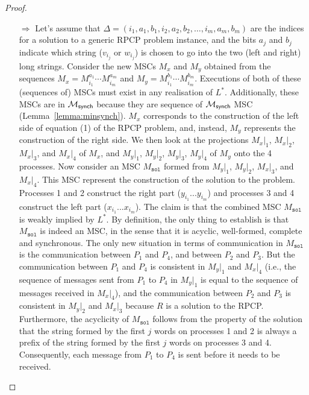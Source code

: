\begin{proof}
	\begin{itemize}
		\item[$\Rightarrow$]
		      Let's assume that
		      $\Delta = (i_1, a_1, b_1, i_2, a_2, b_2, \ldots, i_m, a_m, b_m)$ are the indices
		      for a solution to a generic RPCP problem instance, and the bits $a_j$ and
		      $b_j$ indicate which string ($v_{i_j}$ or $w_{i_j}$) is chosen to go into
		      the two (left and right)
		      long strings. Consider the new MSCs $M_x$ and $M_y$ obtained from the sequences
		      $M_x = M^{a_1}_{i_1} \cdots M^{a_m}_{i_m}$ and $M_y = M^{b_1}_{i_1} \cdots M^{b_m}_{i_m}$.
		      Executions of both of these (sequences of) MSCs must exist in any
		      realisation of $L^*$. Additionally, these MSCs are in $\mathcal{M}_{\mathsf{synch}}$
		      because they are sequence of $\mathcal{M}_{\mathsf{synch}}$ MSC (Lemma~\ref{lemma:minsynch}).
		      $M_x$ corresponds to the construction of the left side of equation (1) of the RPCP
		      problem, and, instead, $M_y$ represents the construction of the right side.
		      We then look at the projections $M_x|_1$, $M_x|_2$, $M_x|_3$,
		      and $M_x|_4$ of $M_x$, and $M_y|_1$, $M_y|_2$, $M_y|_3$, $M_y|_4$ of $M_y$ onto the
		      4 processes. Now consider an MSC $M_{\texttt{sol}}$ formed from $M_y|_1$, $M_y|_2$,
		      $M_x|_3$, and $M_x|_4$. This MSC represent the construction of the solution to
		      the problem. Processes 1 and 2 construct the right part ($y_{i_1}...y_{i_m}$)
		      and processes 3 and 4 construct the left part ($x_{i_1}...x_{i_m}$).
		      The claim is that the combined MSC $M_{\texttt{sol}}$ is weakly
		      implied by $L^*$. By definition, the only thing to establish is that $M_{\texttt{sol}}$
		      is indeed an MSC, in the sense that it is acyclic, well-formed, complete
		      and synchronous.
		      The only new situation in terms of communication in $M_{\texttt{sol}}$ is the
		      communication between $P_1$ and $P_4$, and between $P_2$ and $P_3$.
		      But the communication between $P_1$ and $P_4$ is consistent in
		      $M_y|_1$ and $M_x|_4$ (i.e., the sequence of messages sent from $P_1$ to
		      $P_4$ in $M_y|_1$ is equal to the sequence of messages received in $M_x|_4$),
		      and the communication between $P_2$ and $P_3$ is consistent in
		      $M_y|_2$ and $M_x|_3$ because $R$ is a solution to the RPCP.
		      Furthermore, the acyclicity of $M_{\texttt{sol}}$ follows from the property of the
		      solution that the string formed by the first $j$ words on processes 1
		      and 2 is always a prefix of the string formed by the first $j$ words
		      on processes 3 and 4. Consequently, each message from $P_1$ to $P_4$
		      is sent before it needs to be received.


\end{itemize}
\end{proof}
